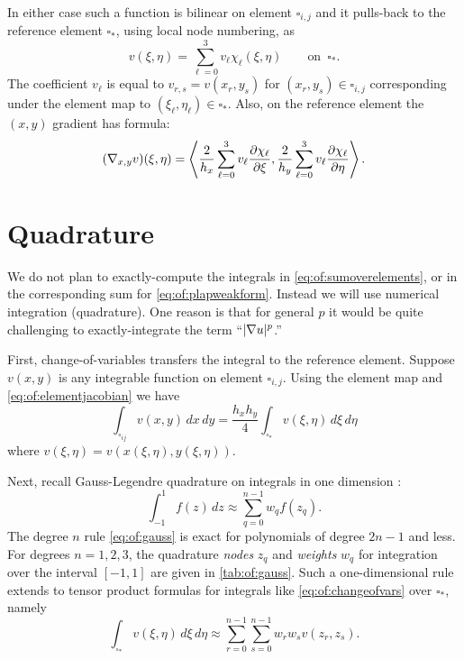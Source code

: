 In either case such a function is bilinear on element $\square_{i,j}$ and it pulls-back to the reference element $\square_\ast$, using local node numbering, as
\begin{equation}
v(\xi,\eta) = \sum_{\ell=0}^3 v_\ell \chi_\ell(\xi,\eta)  \qquad \text{on } \,\square_\ast. \label{eq:of:bilinearref}
\end{equation}
The coefficient $v_\ell$ is equal to $v_{r,s} = v(x_r,y_s)$ for $(x_r,y_s)\in\square_{i,j}$ corresponding under the element map to $(\xi_\ell,\eta_\ell) \in \square_\ast$.  Also, on the reference element the $(x,y)$ gradient has formula:
\begin{equation}
  (\nabla_{x,y} v)(\xi,\eta) = \left<\frac{2}{h_x} \sum_{\ell=0}^3 v_\ell \frac{\partial\chi_\ell}{\partial \xi}, \frac{2}{h_y} \sum_{\ell=0}^3 v_\ell \frac{\partial\chi_\ell}{\partial \eta}\right>. \label{eq:of:gradrepref}
\end{equation}


\section{Quadrature}

We do not plan to exactly-compute the integrals in \eqref{eq:of:sumoverelements}, or in the corresponding sum for \eqref{eq:of:plapweakform}.  Instead we will use numerical integration (quadrature).  One reason is that for general $p$ it would be quite challenging to exactly-integrate the term ``$|\nabla u|^p$.''

First, change-of-variables transfers the integral to the reference element.  Suppose $v(x,y)$ is any integrable function on element $\square_{i,j}$.  Using the element map and \eqref{eq:of:elementjacobian} we have
\begin{equation}
\int_{\square_{ij}} v(x,y)\,dx\,dy = \frac{h_x h_y}{4} \int_{\square_\ast} v(\xi,\eta) \,d\xi\,d\eta \label{eq:of:changeofvars}
\end{equation}
where $v(\xi,\eta)=v(x(\xi,\eta),y(\xi,\eta))$.

Next, recall Gauss-Legendre quadrature on integrals in one dimension \citep{GreenbaumChartier2012}:
\begin{equation}
\int_{-1}^1 f(z)\,dz \approx \sum_{q=0}^{n-1} w_q f(z_q).  \label{eq:of:gauss}
\end{equation}
The degree $n$ rule \eqref{eq:of:gauss} is exact for polynomials of degree $2n-1$ and less.  For degrees $n=1,2,3$, the quadrature \emph{nodes} $z_q$ and \emph{weights} $w_q$ for integration over the interval $[-1,1]$ are given in \ref{tab:of:gauss}.  Such a one-dimensional rule extends to tensor product formulas for integrals like \eqref{eq:of:changeofvars} over $\square_\ast$, namely
\begin{equation}
\int_{\square_\ast} v(\xi,\eta) \,d\xi\,d\eta \approx \sum_{r=0}^{n-1} \sum_{s=0}^{n-1} w_r w_s v(z_r,z_s).  \label{eq:of:tensorgauss}
\end{equation}

